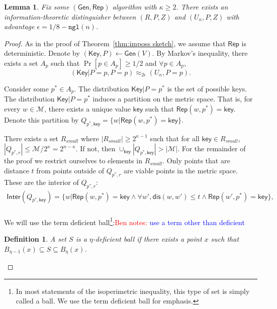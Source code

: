 \documentclass[11pt]{article}
\newcommand{\thref}[1]{\mbox{Theorem~\ref{#1}}}
\newcommand{\class}[1]{{\ensuremath{\mathsf{#1}}}}
\newcommand{\key}{\ensuremath{\class{key}}\xspace}
\newcommand{\Key}{\ensuremath{\class{Key}}\xspace}
\newcommand{\gen}{\ensuremath{\class{Gen}}\xspace}
\newcommand{\rep}{\ensuremath{\class{Rep}}\xspace}
\newcommand{\rec}{\ensuremath{\class{Rec}}\xspace}
\newcommand{\crust}{\ensuremath{\class{Crust}}\xspace}
\newcommand{\inter}{\ensuremath{\class{Inter}}\xspace}
\newcommand{\dis}{\ensuremath{\mathsf{dis}}}
\newcommand{\ngl}{\ensuremath{\mathtt{ngl}}\xspace}
\newtheorem{lemma}[theorem]{Lemma}
\newtheorem{definition}[theorem]{Definition}
\newcommand{\authnote}[2]{{\textcolor{red}{\textsf{#1 notes: }\textcolor{blue}{ #2}}\marginpar{\textcolor{red}{\textbf{!!!!!}}}}}
\newcommand{\authnote}[2]{}
\newcommand{\bnote}[1]{{\authnote{Ben}{#1}}}
\begin{document}
\begin{lemma}
\label{lem:fuzz can't get key}
Fix some $(\gen, \rep)$ algorithm with $\kappa \ge 2$.  There exists an information-theoretic distinguisher between $(R, P, Z)$ and $(U_\kappa, P, Z)$ with advantage $\epsilon = 1/8-\ngl(n)$.
\end{lemma}
\begin{proof}
As in the proof of \thref{thm:imposs sketch}, we assume that $\rep$ is deterministic.  Denote by $(\Key, P) \leftarrow \gen(V)$.
By Markov's inequality, there exists a set $A_{p}$ such that $\Pr[p\in A_{p}]\ge 1/2$ and $\forall p\in A_{p}$, 
\[
(\Key |P =p, P = p ) \approx_{2\epsilon} (U_\kappa , P =p).
\]

Consider some $p^*\in A_{p}$.  %
The distribution $\Key|P=p^*$ is the set of possible keys.
The distribution $\Key|P=p^*$ induces a partition on the metric space.  That is, for every $w\in\mathcal{M}$, there exists a unique value $\key$ such that $\rep(w, p^*) =\key$.  Denote this partition by $Q_{p^*,\key} = \{w | \rep(w, p^*) = \key\}$.  

There exists a set $R_{small}$  where $|R_{small} | \ge 2^{\kappa-1}$ such that for all $\key\in R_{small}$,  $|Q_{p^*, r}|\le \mathcal{M}/2^{\kappa} = 2^{n-\kappa }$.  If not, then $\cup_{\key} |Q_{p^*, \key}| > |\mathcal{M}|$.
For the remainder of the proof we restrict ourselves to elements in $R_{small}$.  Only points that are distance $t$ from points outside of $Q_{p^*, r}$ are viable points in the metric space.  These are the interior of $Q_{p^*, r}$:
\begin{align*}
\inter(Q_{p^*, \key}) = \{w | \rep(w, p^*) = \key \wedge \forall w', \dis(w, w') \le t \wedge \rep(w', p^*) =\key\},\\
\end{align*}

We will use the term deficient ball\footnote{In most statements of the isoperimetric inequality, this type of set is simply called a ball.  We use the term deficient ball for emphasis.}:\bnote{use a term other than deficient}
\begin{definition}
A set $S$ is a $\eta$-deficient ball if there exists a point $x$ such that $B_{\eta-1}(x) \subseteq S \subseteq B_{\eta}(x)$.
\end{definition}


\end{proof}
\end{document}
